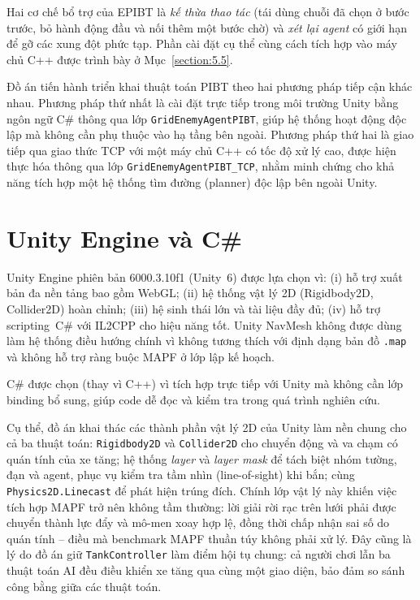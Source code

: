 \documentclass[../DoAn.tex]{subfiles}
\begin{document}
Hai cơ chế bổ trợ của EPIBT là \emph{kế thừa thao tác} (tái dùng chuỗi đã chọn ở bước trước, bỏ
hành động đầu và nối thêm một bước chờ) và \emph{xét lại agent} có giới hạn để gỡ các xung đột
phức tạp. Phần cài đặt cụ thể cùng cách tích hợp vào máy chủ C++ được trình bày ở
Mục~\ref{section:5.5}.

Đồ án tiến hành triển khai thuật toán PIBT theo hai phương pháp tiếp cận khác nhau. Phương pháp thứ nhất là cài đặt trực tiếp trong môi trường Unity bằng ngôn ngữ C\# thông qua lớp \texttt{GridEnemyAgentPIBT}, giúp hệ thống hoạt động độc lập mà không cần phụ thuộc vào hạ tầng bên ngoài. Phương pháp thứ hai là giao tiếp qua giao thức TCP với một máy chủ C++ có tốc độ xử lý cao, được hiện thực hóa thông qua lớp \texttt{GridEnemyAgentPIBT\_TCP}, nhằm minh chứng cho khả năng tích hợp một hệ thống tìm đường (planner) độc lập bên ngoài Unity.

\section{Unity Engine và C\#}
\label{section:3.4}

Unity Engine \cite{unity2024engine} phiên bản 6000.3.10f1 (Unity~6) được lựa chọn vì:
(i) hỗ trợ xuất bản đa nền tảng bao gồm WebGL; (ii) hệ thống vật lý 2D (Rigidbody2D,
Collider2D) hoàn chỉnh; (iii) hệ sinh thái lớn và tài liệu đầy đủ; (iv) hỗ trợ
scripting~C\# với IL2CPP cho hiệu năng tốt. Unity NavMesh không được dùng làm hệ thống
điều hướng chính vì không tương thích với định dạng bản đồ \texttt{.map} và không
hỗ trợ ràng buộc MAPF ở lớp lập kế hoạch.

C\# được chọn (thay vì C++) vì tích hợp trực tiếp với Unity mà không cần lớp binding
bổ sung, giúp code dễ đọc và kiểm tra trong quá trình nghiên cứu.

Cụ thể, đồ án khai thác các thành phần vật lý 2D của Unity làm nền chung cho cả ba thuật toán:
\texttt{Rigidbody2D} và \texttt{Collider2D} cho chuyển động và va chạm có quán tính của xe tăng;
hệ thống \emph{layer} và \emph{layer mask} để tách biệt nhóm tường, đạn và agent, phục vụ kiểm tra
tầm nhìn (line-of-sight) khi bắn; cùng \texttt{Physics2D.Linecast} để phát hiện trúng đích. Chính
lớp vật lý này khiến việc tích hợp MAPF trở nên không tầm thường: lời giải rời rạc trên lưới phải
được chuyển thành lực đẩy và mô-men xoay hợp lệ, đồng thời chấp nhận sai số do quán tính -- điều
mà benchmark MAPF thuần túy không phải xử lý. Đây cũng là lý do đồ án giữ \texttt{TankController}
làm điểm hội tụ chung: cả người chơi lẫn ba thuật toán AI đều điều khiển xe tăng qua cùng một giao
diện, bảo đảm so sánh công bằng giữa các thuật toán.
\end{document}
